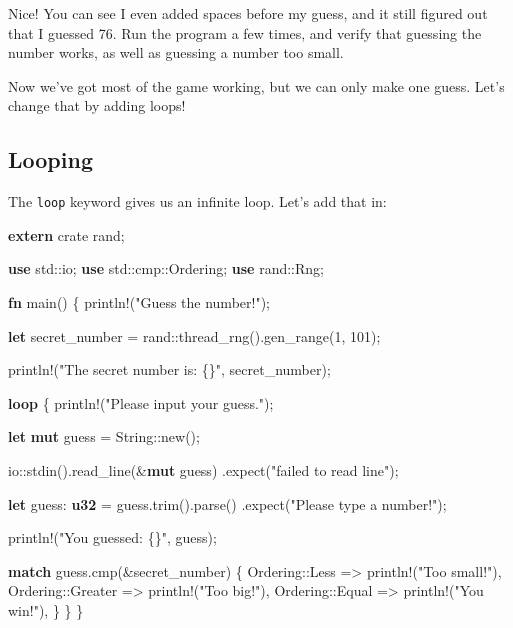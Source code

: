 \documentclass[a4paper,]{book}
\newenvironment{Shaded}{\begin{snugshade}}{\end{snugshade}}
\newcommand{\KeywordTok}[1]{\textcolor[rgb]{0.13,0.29,0.53}{\textbf{{#1}}}}
\newcommand{\DecValTok}[1]{\textcolor[rgb]{0.00,0.00,0.81}{{#1}}}
\newcommand{\StringTok}[1]{\textcolor[rgb]{0.31,0.60,0.02}{{#1}}}
\newcommand{\OtherTok}[1]{\textcolor[rgb]{0.56,0.35,0.01}{{#1}}}
\newcommand{\NormalTok}[1]{{#1}}
\begin{document}
Nice! You can see I even added spaces before my guess, and it still
figured out that I guessed 76. Run the program a few times, and verify
that guessing the number works, as well as guessing a number too small.

Now we've got most of the game working, but we can only make one guess.
Let's change that by adding loops!

\subsection{Looping}\label{looping}

The \texttt{loop} keyword gives us an infinite loop. Let's add that in:

\begin{Shaded}
\begin{Highlighting}[]
\KeywordTok{extern} \NormalTok{crate rand;}

\KeywordTok{use} \NormalTok{std::io;}
\KeywordTok{use} \NormalTok{std::cmp::Ordering;}
\KeywordTok{use} \NormalTok{rand::Rng;}

\KeywordTok{fn} \NormalTok{main() \{}
    \OtherTok{println!}\NormalTok{(}\StringTok{"Guess the number!"}\NormalTok{);}

    \KeywordTok{let} \NormalTok{secret_number = rand::thread_rng().gen_range(}\DecValTok{1}\NormalTok{, }\DecValTok{101}\NormalTok{);}

    \OtherTok{println!}\NormalTok{(}\StringTok{"The secret number is: \{\}"}\NormalTok{, secret_number);}

    \KeywordTok{loop} \NormalTok{\{}
        \OtherTok{println!}\NormalTok{(}\StringTok{"Please input your guess."}\NormalTok{);}

        \KeywordTok{let} \KeywordTok{mut} \NormalTok{guess = String::new();}

        \NormalTok{io::stdin().read_line(&}\KeywordTok{mut} \NormalTok{guess)}
            \NormalTok{.expect(}\StringTok{"failed to read line"}\NormalTok{);}

        \KeywordTok{let} \NormalTok{guess: }\KeywordTok{u32} \NormalTok{= guess.trim().parse()}
            \NormalTok{.expect(}\StringTok{"Please type a number!"}\NormalTok{);}

        \OtherTok{println!}\NormalTok{(}\StringTok{"You guessed: \{\}"}\NormalTok{, guess);}

        \KeywordTok{match} \NormalTok{guess.cmp(&secret_number) \{}
            \NormalTok{Ordering::Less    => }\OtherTok{println!}\NormalTok{(}\StringTok{"Too small!"}\NormalTok{),}
            \NormalTok{Ordering::Greater => }\OtherTok{println!}\NormalTok{(}\StringTok{"Too big!"}\NormalTok{),}
            \NormalTok{Ordering::Equal   => }\OtherTok{println!}\NormalTok{(}\StringTok{"You win!"}\NormalTok{),}
        \NormalTok{\}}
    \NormalTok{\}}
\NormalTok{\}}
\end{Highlighting}
\end{Shaded}
\end{document}
